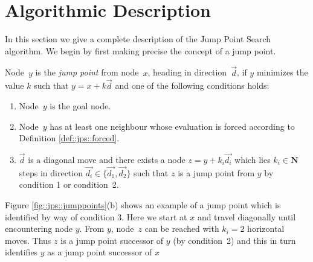 \section{Algorithmic Description}
\label{cha::jps::algorithm}


In this section we give a complete description of the Jump Point Search
algorithm.  We begin by first making precise the concept of a jump point.

\begin{definition}
\label{def::jps::jump}
Node~$y$ is the \emph{jump point} from node~$x$, heading in direction~$\vec{d}$,
if $y$ minimizes the value $k$ such that $y = x + k \vec{d}$ and one of the
following conditions holds:
\begin{enumerate}
\item{Node~$y$ is the goal node.}
\item{Node~$y$ has at least one neighbour whose evaluation is forced according 
to Definition \ref{def::jps::forced}.}
\item{$\vec{d}$ is a diagonal move and there exists a node $z = y +
k_i\vec{d_{i}}$ which lies $k_i \in \mathbf{N}$ steps in direction $\vec{d_i} \in
\{\vec{d_1},\vec{d_2}\}$ such that $z$ is a jump point from $y$ by condition 1 or condition~2.}
\end{enumerate}
\end{definition}

Figure \ref{fig::jps::jumppoints}(b) shows an example of a jump point which is
identified by way of condition 3.
Here we start at $x$ and travel diagonally until encountering node $y$. 
From $y$, node~$z$ can be reached with $k_i = 2$ horizontal moves.
Thus $z$ is a jump point successor of $y$ (by condition~2) and this in turn
identifies $y$ as a jump point successor of $x$ 



